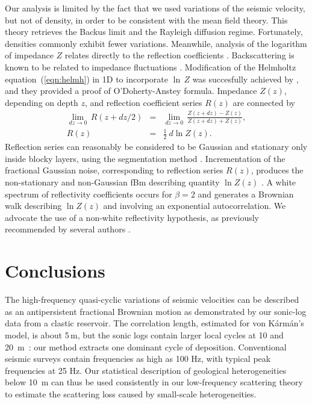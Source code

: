 Our analysis is limited by the fact that we used variations of the
seismic velocity, but not of density, in order to be consistent with
the mean field theory.  This theory retrieves the Backus limit and the
Rayleigh diffusion regime.  Fortunately, densities commonly exhibit
fewer variations.  Meanwhile, analysis of the logarithm of impedance
$Z$ relates directly to the reflection coefficients
\cite[]{Shtatland_91}.  Backscattering is known to be related to
impedance fluctuations \cite[]{Banik_LS85,Wu_88}.  Modification of the
Helmholtz equation~(\ref{eqn:helmh}) in 1D to incorporate $\ln\,Z$ was
succesfully achieved by \cite{Banik_LS85}, and they provided a proof
of O'Doherty-Anstey formula.  Impedance $Z(z)$, depending on depth
$z$, and reflection coefficient series $R(z)$ are connected by
\begin{eqnarray}
\lim_{dz\rightarrow 0}\,R(z+dz/2) & = & \lim_{dz\rightarrow 0}\,\frac{Z(z+dz)-Z(z)}{Z(z+dz)+Z(z)},\\
R(z) & = & \frac{1}{2}~{d\ln Z(z)}.
\end{eqnarray}
Reflection series can reasonably be considered to be Gaussian and stationary
only inside blocky layers, using the segmentation method \cite[]{Todoeschuck_JL90}.
Incrementation of the fractional Gaussian noise, corresponding to
reflection series $R(z)$, produces the non-stationary and non-Gaussian fBm describing quantity $\ln Z(z)$
\cite[]{Shtatland_91}.
A white spectrum of reflectivity coefficients occurs for $\beta=2$ and generates a Brownian walk describing $\ln Z(z)$
and involving an exponential autocorrelation.
We advocate the use of a non-white reflectivity hypothesis, as previously recommended by 
several authors \cite[]{Todoeschuck_JL90,Lancaster_W00,Anstey_D02b}.

\section{Conclusions}

The high-frequency quasi-cyclic variations of seismic velocities
can be described as an antipersistent fractional Brownian motion
as demonstrated by our sonic-log data from a clastic reservoir.
The correlation length, estimated for von K\'arm\'an's model,
is about 5\,m, but the sonic logs contain
larger local cycles at 10 and 20~m~: our method extracts  
one dominant cycle of deposition.
Conventional seismic surveys contain frequencies as high as 100 Hz,
with typical peak frequencies at 25 Hz.
Our statistical description of geological heterogeneities below 10~m
can thus be used consistently in our low-frequency scattering theory
to estimate the scattering loss caused by small-scale heterogeneities.

